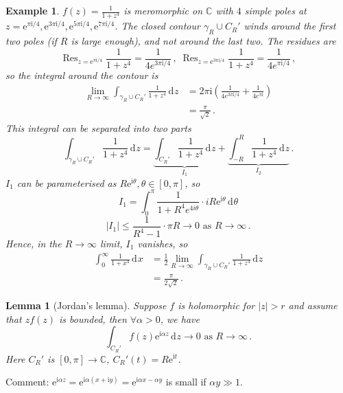 \documentclass{article}
\theoremstyle{plain}\theoremheaderfont{\normalfont\itshape}\theorembodyfont{\rmfamily}\theoremseparator{.}\newtheorem*{rem}{Remark}\newtheorem*{ex}{Example}\newtheorem*{proof}{Proof}\newtheorem*{altp}{Alternative proof}\newtheorem*{con}{Consequences}\newtheorem*{notn}{Notations}\newtheorem*{cau}{Caution}\newtheorem*{term}{Terminology}\newtheorem*{keyex}{Key example}
\theoremstyle{plain}\theoremheaderfont{\normalfont\bfseries}\theorembodyfont{\rmfamily}\theoremseparator{.}\newtheorem{thm}{Theorem}[section]\newtheorem{lem}[thm]{Lemma}\newtheorem{prop}[thm]{Proposition}\newtheorem*{cor}{Corollary}\newtheorem{defn}[thm]{Definition}\newtheorem{clm}[thm]{Claim}\newtheorem{clminproof}{Claim}\newtheorem{leminproof}{Lemma}\newtheorem{app}{Application}
\theoremstyle{break}\theoremheaderfont{\normalfont\itshape}\theorembodyfont{\rmfamily}\theoremseparator{.\medskip}\newtheorem*{proofskip}{Proof}\newtheorem*{exs}{Examples}\newtheorem*{rems}{Remarks}\newtheorem*{rec}{Recall}\newtheorem*{ppts}{Properties}
\theoremstyle{break}\theoremheaderfont{\normalfont\bfseries}\theorembodyfont{\rmfamily}\theoremseparator{.\medskip}\newtheorem{lemskip}[thm]{Lemma}\newtheorem{defnskip}[thm]{Definition}\newtheorem{propskip}[thm]{Proposition}\newtheorem{thmskip}[thm]{Theorem}
\numberwithin{equation}{section}
\newcommand{\ii}{\mathrm{i}}
\newcommand{\ee}{\mathrm{e}}
\DeclareMathOperator*{\Res}{Res}
\newcommand{\abs}[1]{\left|#1\right|}
\newcommand{\dd}[2][]{\,\mathrm{d}^{#1} #2}
\newcommand{\CC}{\mathbb{C}}
\begin{document}
\begin{ex}
        \(f(z)=\frac{1}{1+z^4}\) is meromorphic on \(\CC\) with \(4\) simple poles at \(z=\ee^{\pi \ii/4},\ee^{3\pi \ii/4},\ee^{5\pi \ii/4},\ee^{7\pi \ii/4}\). The closed contour \(\gamma_R\cup C_R'\) winds around the first two poles (if \(R\) is large enough), and not around the last two. The residues are
        \[\Res_{z=\ee^{\pi \ii/4}}\frac{1}{1+z^4}=\frac{1}{4e^{3\pi \ii/4}}\,,\;\Res_{z=\ee^{3\pi \ii/4}}\frac{1}{1+z^4}=\frac{1}{4e^{\pi \ii/4}}\,,\]
        so the integral around the contour is
        \begin{align*}
            \lim_{R\to\infty}\int_{\gamma_R\cup C_R'}\frac{1}{1+z^4}\dd{z}&=2\pi \ii\left(\frac{1}{4e^{3\pi \ii/4}}+\frac{1}{4e^{\pi \ii}}\right)\\
            &=\frac{\pi}{\sqrt{2}}\,.
        \end{align*}
        This integral can be separated into two parts
        \[\int_{\gamma_R\cup C_R'}\frac{1}{1+z^4}\dd{z}=\underbrace{\int_{C_R'}\frac{1}{1+z^4}\dd{z}}_{I_1}+\underbrace{\int_{-R}^{R}\frac{1}{1+z^4}\dd{z}}_{I_2}\,.\]
        \(I_1\) can be parameterised as \(R \ee^{\ii \theta},\theta\in[0,\pi]\), so
        \[I_1=\int_{0}^{\pi}\frac{1}{1+R^4e^{4i\theta}}\cdot iR\ee^{\ii \theta}\dd{\theta}\]
        \[\abs{I_1}\le\frac{1}{R^4-1}\cdot\pi R\to 0\text{ as }R\to \infty\,.\]
        Hence, in the \(R\to\infty\) limit, \(I_1\) vanishes, so
        \begin{align*}
            \int_{0}^{\infty}\frac{1}{1+x^4}\dd{x}&=\frac{1}{2}\lim_{R\to\infty}\int_{\gamma_R\cup C_R'}\frac{1}{1+z^4}\dd{z}\\
            &=\frac{\pi}{2\sqrt{2}}\,.
        \end{align*}
    \end{ex}
    \begin{lem}[Jordan's lemma]
        Suppose \(f\) is holomorphic for \(\abs{z}>r\) and assume that \(zf(z)\) is bounded, then \(\forall\alpha>0\), we have
        \[\int_{C_R'}f(z)\ee^{\ii \alpha z}\dd{z}\to 0\text{ as }R\to\infty\,.\]
        Here \(C_R'\) is \([0,\pi]\to\CC\), \(C_{R}'(t)=R\ee^{\ii t}\).        
    \end{lem}
    Comment: \(\ee^{\ii \alpha z}=\ee^{\ii \alpha(x+\ii y)}=\ee^{\ii \alpha x-\alpha y}\) is small if \(\alpha y\gg 1\).
\end{document}
